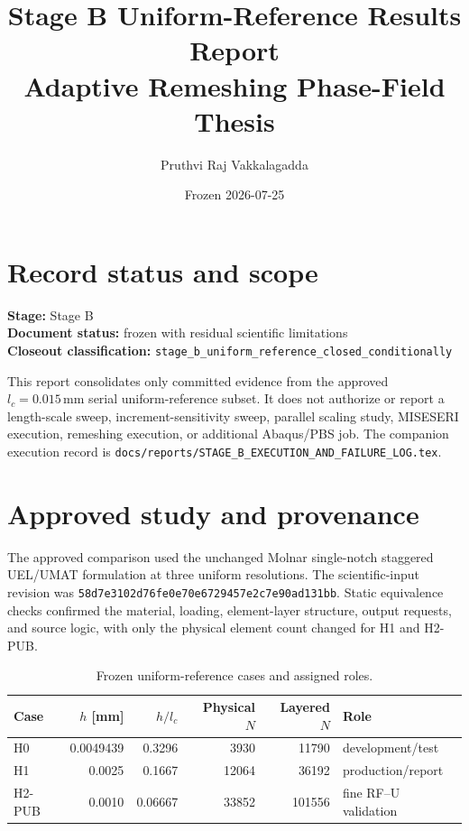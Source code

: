 \documentclass[11pt,a4paper]{article}
\title{Stage B Uniform-Reference Results Report\\Adaptive Remeshing Phase-Field Thesis}
\author{Pruthvi Raj Vakkalagadda}
\date{Frozen 2026-07-25}
\begin{document}
\maketitle

\section*{Record status and scope}

\noindent\textbf{Stage:} Stage B\\
\textbf{Document status:} frozen with residual scientific limitations\\
\textbf{Closeout classification:}
\texttt{stage\_b\_uniform\_reference\_closed\_conditionally}

\medskip

This report consolidates only committed evidence from the approved
\(l_c=0.015\,\mathrm{mm}\) serial uniform-reference subset.  It does not
authorize or report a length-scale sweep, increment-sensitivity sweep,
parallel scaling study, MISESERI execution, remeshing execution, or additional
Abaqus/PBS job.  The companion execution record is
\texttt{docs/reports/STAGE\_B\_EXECUTION\_AND\_FAILURE\_LOG.tex}.

\section{Approved study and provenance}

The approved comparison used the unchanged Molnar single-notch staggered
UEL/UMAT formulation at three uniform resolutions.  The scientific-input
revision was
\texttt{58d7e3102d76fe0e70e6729457e2c7e90ad131bb}.  Static equivalence checks
confirmed the material, loading, element-layer structure, output requests,
and source logic, with only the physical element count changed for H1 and
H2-PUB.

\begin{table}[h]
\centering
\caption{Frozen uniform-reference cases and assigned roles.}
\begin{tabular}{@{}lrrrrl@{}}
\toprule
Case & \(h\) [mm] & \(h/l_c\) & Physical \(N\) & Layered \(N\) & Role \\
\midrule
H0 & 0.0049439 & 0.3296 & 3930 & 11790 & development/test \\
H1 & 0.0025 & 0.1667 & 12064 & 36192 & production/report \\
H2-PUB & 0.0010 & 0.06667 & 33852 & 101556 & fine RF--U validation \\
\bottomrule
\end{tabular}
\end{table}
\end{document}
